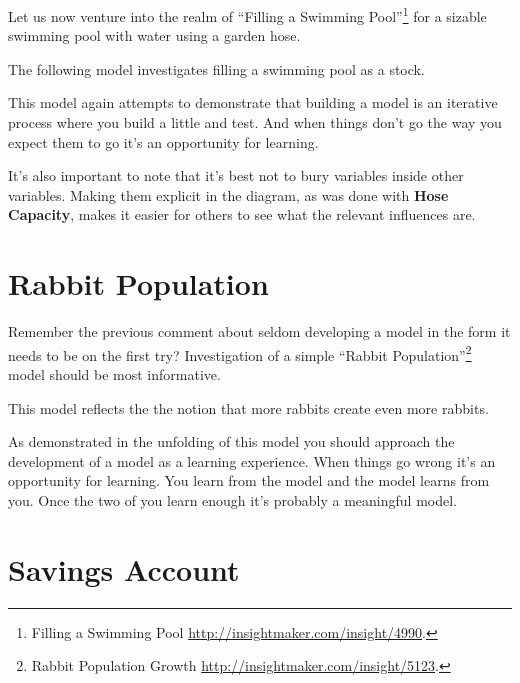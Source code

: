 \documentclass[]{memoir}
\begin{document}
Let us now venture into the realm of ``Filling a Swimming
Pool''\footnote{Filling a Swimming Pool
  \url{http://insightmaker.com/insight/4990}.} for a sizable swimming
pool with water using a garden hose.

\FloatBarrier 

\begin{model}[frametitle={Model: Filling a Swimming Pool}] 

 The following model investigates filling a swimming pool as a stock.




 \end{model}

This model again attempts to demonstrate that building a model is an
iterative process where you build a little and test. And when things
don't go the way you expect them to go it's an opportunity for learning.

It's also important to note that it's best not to bury variables inside
other variables. Making them explicit in the diagram, as was done with
\textbf{Hose Capacity}, makes it easier for others to see what the
relevant influences are.

\section{Rabbit Population}

Remember the previous comment about seldom developing a model in the
form it needs to be on the first try? Investigation of a simple ``Rabbit
Population''\footnote{Rabbit Population Growth
  \url{http://insightmaker.com/insight/5123}.} model should be most
informative.

\FloatBarrier 

\begin{model}[frametitle={Model: Rabbit Population}] 

 This model reflects the the notion that more rabbits create even more rabbits.




 \end{model}

As demonstrated in the unfolding of this model you should approach the
development of a model as a learning experience. When things go wrong
it's an opportunity for learning. You learn from the model and the model
learns from you. Once the two of you learn enough it's probably a
meaningful model.

\section{Savings Account}
\end{document}
